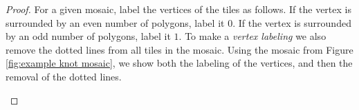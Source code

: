 \begin{proof}


For a given mosaic, label the vertices of the tiles as follows. If the vertex is surrounded by an even number of polygons, label it $0$. If the vertex is surrounded by an odd number of polygons, label it $1$. To make a \textit{vertex labeling} we also remove the dotted lines from all tiles in the mosaic. Using the mosaic from Figure \ref{fig:example knot mosaic}, we show both the labeling of the vertices, and then the removal of the dotted lines.

\begin{center}
\end{center}
\end{proof}
